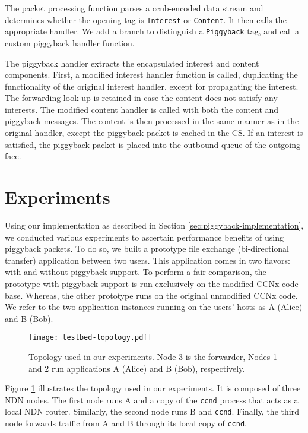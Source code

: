 \documentclass[conference]{IEEEtran}
\begin{document}
The packet processing function parses a ccnb-encoded data stream and determines
whether the opening tag is \verb|Interest| or \verb|Content|. It then calls the appropriate 
handler. We add a branch to distinguish a \verb|Piggyback| tag, and call a custom
piggyback handler function.

The piggyback handler extracts the encapsulated interest and content components. 
First, a modified interest handler function is called, duplicating the functionality of the 
original interest handler, except for propagating the interest. The forwarding look-up 
is retained in case the content does not satisfy any interests. The modified content 
handler is called with both the content and piggyback messages. The content is then
processed in the same manner as in the original handler, except the piggyback packet 
is cached in the CS. If an interest is satisfied, the piggyback packet is placed into the
outbound queue of the outgoing face.

\section{Experiments}
\label{sec:experiment}
Using our implementation as described in Section \ref{sec:piggyback-implementation}, we 
conducted various experiments to ascertain performance benefits of using piggyback packets. 
To do so, we built a prototype file exchange (bi-directional transfer) application between two users. 
This application comes in two flavors: with and without piggyback support. To perform a fair 
comparison, the prototype with piggyback support is run exclusively on the modified 
CCNx code base. Whereas, the other prototype 
runs on the original unmodified CCNx code. 
We refer to the two application instances running on the users' hosts as A (Alice) and B (Bob). 

\begin{figure}[htb]
\centering
\texttt{[image: testbed-topology.pdf]}
\caption{Topology used in our experiments. Node 3 is the forwarder, Nodes 1 and 2 run 
applications A (Alice) and B (Bob), respectively.}
\label{fig:topology}
\end{figure}

Figure \ref{fig:topology} illustrates the topology used in our experiments. It is composed of three 
NDN nodes. The first node runs A and a copy of the \verb|ccnd| process that acts as a local NDN 
router. Similarly, the second node runs B and \verb|ccnd|. Finally, the third node forwards 
traffic from A and B  through its local copy of \verb|ccnd|.
\end{document}
